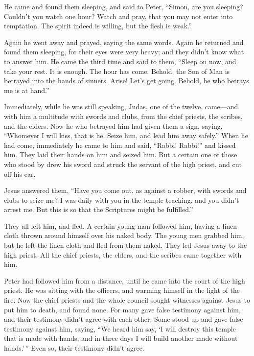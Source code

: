  He came and found them sleeping, and said to Peter,
``Simon, are you sleeping? Couldn't you watch one hour? 
Watch and pray, that you may not enter into temptation. The spirit
indeed is willing, but the flesh is weak.''

 Again he went away and prayed, saying the same words.
 Again he returned and found them sleeping, for their
eyes were very heavy; and they didn't know what to answer him.
 He came the third time and said to them, ``Sleep on now,
and take your rest. It is enough. The hour has come. Behold, the Son of
Man is betrayed into the hands of sinners.  Arise! Let's
get going. Behold, he who betrays me is at hand.''

 Immediately, while he was still speaking, Judas, one of
the twelve, came---and with him a multitude with swords and clubs, from
the chief priests, the scribes, and the elders.  Now he
who betrayed him had given them a sign, saying, ``Whomever I will kiss,
that is he. Seize him, and lead him away safely.''  When
he had come, immediately he came to him and said, ``Rabbi! Rabbi!'' and
kissed him.  They laid their hands on him and seized him.
 But a certain one of those who stood by drew his sword
and struck the servant of the high priest, and cut off his ear.

 Jesus answered them, ``Have you come out, as against a
robber, with swords and clubs to seize me?  I was daily
with you in the temple teaching, and you didn't arrest me. But this is
so that the Scriptures might be fulfilled.''

 They all left him, and fled.  A certain
young man followed him, having a linen cloth thrown around himself over
his naked body. The young men grabbed him,  but he left
the linen cloth and fled from them naked.  They led Jesus
away to the high priest. All the chief priests, the elders, and the
scribes came together with him.

 Peter had followed him from a distance, until he came
into the court of the high priest. He was sitting with the officers, and
warming himself in the light of the fire.  Now the chief
priests and the whole council sought witnesses against Jesus to put him
to death, and found none.  For many gave false testimony
against him, and their testimony didn't agree with each other.
 Some stood up and gave false testimony against him,
saying,  ``We heard him say, `I will destroy this temple
that is made with hands, and in three days I will build another made
without hands.'\,''  Even so, their testimony didn't
agree.


